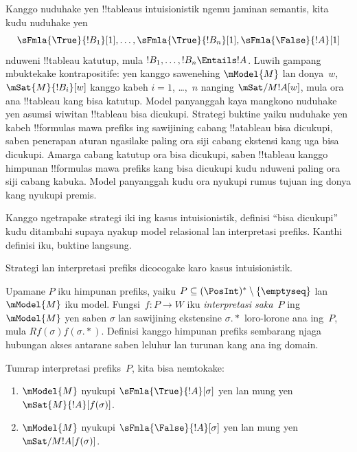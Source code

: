 \documentclass[../../../include/open-logic-section]{subfiles}
\begin{document}


\begin{explain}
  Kanggo nuduhake yen !!{tableau}s intuisionistik ngemu jaminan
  semantis, kita kudu nuduhake yen
  \[
  \sFmla{\True}{!B_1}[1], \dots, \sFmla{\True}{!B_n}[1], \sFmla{\False}{!A}[1]
  \]
  nduweni !!{tableau} katutup, mula $!B_1, \dots, !B_n \Entails !A$.
  Luwih gampang mbuktekake kontrapositife: yen kanggo sawenehing
  $\mModel{M}$ lan donya~$w$, $\mSat{M}{!B_i}[w]$ kanggo kabeh
  $i=1$, \dots,~$n$ nanging $\mSat/{M}{!A}[w]$, mula ora ana
  !!{tableau} kang bisa katutup. Model panyanggah kaya mangkono
  nuduhake yen asumsi wiwitan !!{tableau} bisa dicukupi. Strategi
  buktine yaiku nuduhake yen kabeh !!{formula}s mawa prefiks ing
  sawijining cabang !!a{tableau} bisa dicukupi, saben penerapan
  aturan ngasilake paling ora siji cabang ekstensi kang uga bisa
  dicukupi. Amarga cabang katutup ora bisa dicukupi, saben !!{tableau}
  kanggo himpunan !!{formula}s mawa prefiks kang bisa dicukupi kudu
  nduweni paling ora siji cabang kabuka.
Model panyanggah kudu ora nyukupi rumus tujuan ing donya kang nyukupi premis.

  Kanggo ngetrapake strategi iki ing kasus intuisionistik, definisi
  ``bisa dicukupi'' kudu ditambahi supaya nyakup model relasional
  lan interpretasi prefiks. Kanthi definisi iku, buktine langsung.
\end{explain}
Strategi lan interpretasi prefiks dicocogake karo kasus intuisionistik.

\begin{defn}
  Upamane $P$ iku himpunan prefiks, yaiku
  $P \subseteq (\PosInt)^* \setminus \{\emptyseq\}$ lan
  $\mModel{M}$ iku model. Fungsi~$f\colon P \to W$ iku
  \emph{interpretasi saka}~$P$ ing~$\mModel{M}$ yen saben $\sigma$
  lan sawijining ekstensine $\sigma.{*}$ loro-lorone ana ing~$P$,
  mula $Rf(\sigma)f(\sigma.{*})$.
Definisi kanggo himpunan prefiks sembarang njaga hubungan akses antarane saben leluhur lan turunan kang ana ing domain.

  Tumrap interpretasi prefiks~$P$, kita bisa nemtokake:
  \begin{enumerate}
  \item $\mModel{M}$ nyukupi $\sFmla{\True}{!A}[\sigma]$ yen lan mung yen
    $\mSat{M}{!A}[f(\sigma)]$.
  \item $\mModel{M}$ nyukupi $\sFmla{\False}{!A}[\sigma]$ yen lan mung yen
    $\mSat/{M}{!A}[f(\sigma)]$.
  \end{enumerate}
\end{defn}
\end{document}
